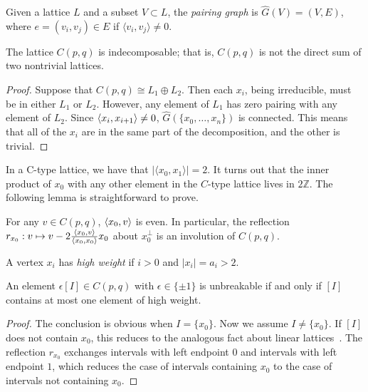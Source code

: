 \begin{definition}\label{defn:pairinggraph}
Given a lattice $L$ and a subset $V\subset L$, the {\it pairing graph} is $\hat{G}(V) = (V, E)$, where $e = (v_i, v_j) \in E$ if $\langle v_i, v_j \rangle \neq 0$.
\end{definition}

\begin{cor}\label{indecomposable}
The lattice $C(p,q)$ is indecomposable; that is, $C(p,q)$ is not the direct sum of two nontrivial lattices.
\end{cor}
\begin{proof}
Suppose that $C(p,q) \cong L_1 \oplus L_2$. Then each $x_i$, being irreducible, must be in either $L_1$ or $L_2$. However, any element of $L_1$ has zero pairing with any element of $L_2$. Since $\left\langle x_i , x_{i+1} \right\rangle\ne0$, $\hat{G}(\{x_0, \dots, x_n\})$ is connected. This means that all of the $x_i$ are in the same part of the decomposition, and the other is trivial.
\end{proof}

In a C-type lattice, we have that $|\langle x_0, x_1\rangle |=2$. It turns out that the inner product of $x_0$ with any other element in the $C$-type lattice lives in $2\mathbb Z$. The following lemma is straightforward to prove.


\begin{lemma}\label{Lem:X0Odd}
For any $v \in C(p,q)$, $\left\langle x_0 , v \right\rangle$ is even. In particular, the reflection $r_{x_0}: v \mapsto v - 2\frac{\left\langle x_0 , v \right\rangle}{\left\langle x_0 , x_0 \right\rangle}x_0$ about $x_0^{\perp}$ is an involution of $C(p,q)$.
\end{lemma}

\begin{definition}\label{Def:HighNorm}
A vertex $x_i$ has {\it high weight} if $i > 0$ and $|x_i| = a_i > 2$.
\end{definition}

\begin{prop}
An element $\epsilon[I] \in C(p,q)$ with $\epsilon \in \{\pm 1 \}$ is unbreakable if and only if $[I]$ contains at most one element of high weight.
\end{prop}
\begin{proof}
The conclusion is obvious when $I=\{x_0\}$. Now we assume $I\ne\{x_0\}$.
If $[I]$ does not contain $x_0$, this reduces to the analogous fact about linear lattices~\cite[Corollary~3.5 (4)]{greene:LSRP}. The reflection $r_{x_0}$ exchanges intervals with left endpoint $0$ and intervals with left endpoint $1$, which reduces the case of intervals containing $x_0$ to the case of intervals not containing $x_0$.
\end{proof}

